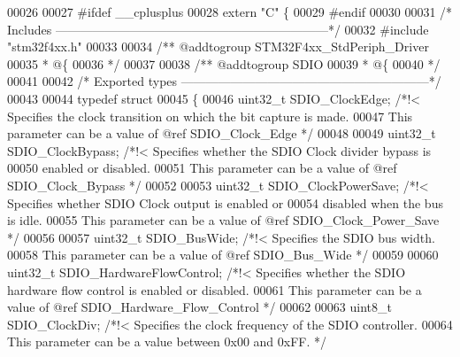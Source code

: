 \begin{DoxyCode}
00026 
00027 \textcolor{preprocessor}{#}\textcolor{preprocessor}{ifdef} \_\_cplusplus
00028  \textcolor{keyword}{extern} \textcolor{stringliteral}{"C"} \{
00029 \textcolor{preprocessor}{#}\textcolor{preprocessor}{endif}
00030 
00031 \textcolor{comment}{/* Includes ------------------------------------------------------------------*/}
00032 \textcolor{preprocessor}{#}\textcolor{preprocessor}{include} "stm32f4xx.h"
00033 
00034 \textcolor{comment}{/** @addtogroup STM32F4xx\_StdPeriph\_Driver}
00035 \textcolor{comment}{  * @\{}
00036 \textcolor{comment}{  */}
00037 
00038 \textcolor{comment}{/** @addtogroup SDIO}
00039 \textcolor{comment}{  * @\{}
00040 \textcolor{comment}{  */}
00041 
00042 \textcolor{comment}{/* Exported types ------------------------------------------------------------*/}
00043 
00044 \textcolor{keyword}{typedef} \textcolor{keyword}{struct}
00045 \{
00046   uint32\_t SDIO_ClockEdge;            \textcolor{comment}{/*!< Specifies the clock transition on which the bit capture is
       made.}
00047 \textcolor{comment}{                                           This parameter can be a value of @ref SDIO\_Clock\_Edge */}
00048 
00049   uint32\_t SDIO_ClockBypass;          \textcolor{comment}{/*!< Specifies whether the SDIO Clock divider bypass is}
00050 \textcolor{comment}{                                           enabled or disabled.}
00051 \textcolor{comment}{                                           This parameter can be a value of @ref SDIO\_Clock\_Bypass */}
00052 
00053   uint32\_t SDIO_ClockPowerSave;       \textcolor{comment}{/*!< Specifies whether SDIO Clock output is enabled or}
00054 \textcolor{comment}{                                           disabled when the bus is idle.}
00055 \textcolor{comment}{                                           This parameter can be a value of @ref SDIO\_Clock\_Power\_Save
       */}
00056 
00057   uint32\_t SDIO_BusWide;              \textcolor{comment}{/*!< Specifies the SDIO bus width.}
00058 \textcolor{comment}{                                           This parameter can be a value of @ref SDIO\_Bus\_Wide */}
00059 
00060   uint32\_t SDIO_HardwareFlowControl;  \textcolor{comment}{/*!< Specifies whether the SDIO hardware flow control is enabled
       or disabled.}
00061 \textcolor{comment}{                                           This parameter can be a value of @ref
       SDIO\_Hardware\_Flow\_Control */}
00062 
00063   uint8\_t SDIO_ClockDiv;              \textcolor{comment}{/*!< Specifies the clock frequency of the SDIO controller.}
00064 \textcolor{comment}{                                           This parameter can be a value between 0x00 and 0xFF. */}

\end{DoxyCode}
